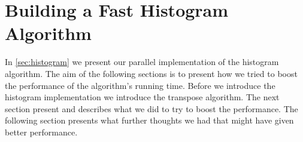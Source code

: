 \chapter{Building a Fast Histogram Algorithm}
\label{chap:fast histo}

In \cref{sec:histogram} we present our parallel implementation of the histogram algorithm.
The aim of the following sections is to present how we tried to boost the performance of the algorithm's running time.
Before we introduce the histogram implementation we introduce the transpose algorithm.
The next section present and describes what we did to try to boost the performance.
The following section presents what further thoughts we had that might have given better performance.



